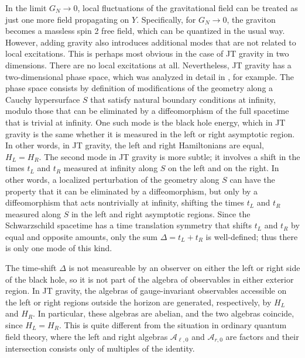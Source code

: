 \documentclass[11pt,a4paper]{article}
\def\A{{\mathcal A}}
\begin{document}
In the limit $G_N \to 0$, local fluctuations of the gravitational field can be treated as just one more field propagating on $Y$. 
Specifically, for $G_N \to 0$, the graviton becomes a massless spin 2 free field, which can be quantized in the usual way. 
However, adding gravity also introduces additional modes that are not related to local excitations. 
This is perhaps most obvious in the case of JT gravity in two dimensions.    There are no local excitations at all.   Nevertheless, JT gravity has a two-dimensional
phase space, which was analyzed in detail in \cite{JaffHar}, for example.  The phase space consists by definition of modifications of the geometry along a
Cauchy hypersurface $S$ that satisfy natural boundary conditions at infinity, 
modulo those that can be eliminated by a diffeomorphism of the full spacetime that is trivial at infinity.
One such mode is the black hole energy, which in JT gravity is the same whether
it is measured in the left or right asymptotic region.   In other words, in JT gravity, the left and right Hamiltonians are equal, $H_L = H_R$.    The second mode 
in JT gravity is more subtle; it involves a shift  in the times $t_L$ and $t_R$ measured at infinity along $S$ on the left and on the right.   In other words, 
a localized perturbation of the geometry along $S$ can have the property that it can be eliminated by a diffeomorphism, but only by a diffeomorphism
that acts nontrivially at infinity, shifting the times $t_L$ and $t_R$ measured along $S$ in the left and right asymptotic regions.
Since the Schwarzschild spacetime has a time translation symmetry that shifts
$t_L$ and $t_R$ by equal and opposite amounts, only the sum $\Delta = t_L +  t_R$ is well-defined; thus there is only one mode of this kind.
   
   
   The time-shift  $\Delta$ is not measureable
by an observer on either the left or right side of the black hole, so it is not part of the algebra of observables in either exterior region.   In JT gravity, the algebras
of gauge-invariant observables accessible on the left or right regions outside the horizon are generated, respectively, by $H_L$ and $H_R$.    In particular,
these algebras are abelian, and the two algebras coincide, since $H_L=H_R$.   This is quite different from the situation in ordinary quantum field theory,
where the left and right algebras $\A_{\ell,0}$ and $\A_{r,0}$ are factors and their intersection consists only of multiples of the identity.
\end{document}
